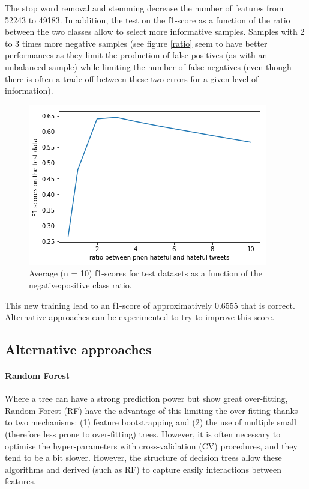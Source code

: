 \documentclass[a4paper]{tufte-handout}
\begin{document}
\begin{fullwidth}
The stop word removal and stemming decrease the number of features from 52243 to 49183.
In addition, the test on the f1-score as a function of the ratio between the two classes allow to select more informative samples. Samples with 2 to 3 times more negative samples (see figure \ref{ratio} seem to have better performances as they limit the production of false positives (as with an unbalanced sample) while limiting the number of false negatives (even though there is often a trade-off between these two errors for a given level of information).

\begin{figure}\label{ratio}
  \includegraphics[]{images/sample_ratio_TSA.png}
  \caption{Average (n = 10) f1-scores for test datasets as a function of the negative:positive class ratio.}
  \label{fig:marginfig}
\end{figure}

This new training lead to an f1-score of approximatively 0.6555 that is correct. Alternative approaches can be experimented to try to improve this score.

\subsection{Alternative approaches}

\paragraph{Random Forest}

Where a tree can have a strong prediction power but show great over-fitting, Random Forest (RF) have the advantage of this limiting the over-fitting thanks to two mechanisms: (1) feature bootstrapping and (2) the use of multiple small (therefore less prone to over-fitting) trees. However, it is often necessary to optimise the hyper-parameters with cross-validation (CV) procedures, and they tend to be a bit slower. However, the structure of decision trees allow these algorithms and derived (such as RF) to capture easily interactions between features.


\end{fullwidth}
\end{document}

